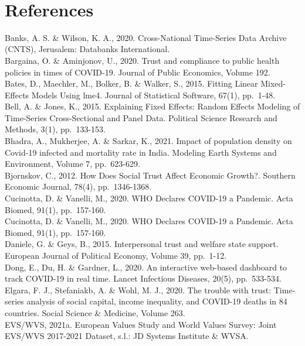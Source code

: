 \documentclass[
  11pt,
]{article}
\begin{document}
~\\

\newpage

\hypertarget{references}{%
\section*{References}\label{references}}

Banks, A. S. \& Wilson, K. A., 2020. Cross-National Time-Series Data Archive (CNTS), Jerusalem: Databanks International.\\
Bargaina, O. \& Aminjonov, U., 2020. Trust and compliance to public health policies in times of COVID-19. Journal of Public Economics, Volume 192.\\
Bates, D., Maechler, M., Bolker, B. \& Walker, S., 2015. Fitting Linear Mixed-Effects Models Using lme4. Journal of Statistical Software, 67(1), pp.~1-48.\\
Bell, A. \& Jones, K., 2015. Explaining Fixed Effects: Random Effects Modeling of Time-Series Cross-Sectional and Panel Data. Political Science Research and Methods, 3(1), pp.~133-153.\\
Bhadra, A., Mukherjee, A. \& Sarkar, K., 2021. Impact of population density on Covid-19 infected and mortality rate in India. Modeling Earth Systems and Environment, Volume 7, pp.~623-629.\\
Bjornskov, C., 2012. How Does Social Trust Affect Economic Growth?. Southern Economic Journal, 78(4), pp.~1346-1368.\\
Cucinotta, D. \& Vanelli, M., 2020. WHO Declares COVID-19 a Pandemic. Acta Biomed, 91(1), pp.~157-160.\\
Cucinotta, D. \& Vanelli, M., 2020. WHO Declares COVID-19 a Pandemic. Acta Biomed, 91(1), pp.~157-160.\\
Daniele, G. \& Geys, B., 2015. Interpersonal trust and welfare state support. European Journal of Political Economy, Volume 39, pp.~1-12.\\
Dong, E., Du, H. \& Gardner, L., 2020. An interactive web-based dashboard to track COVID-19 in real time. Lancet Infectious Diseases, 20(5), pp.~533-534.\\
Elgara, F. J., Stefaniakb, A. \& Wohl, M. J., 2020. The trouble with trust: Time-series analysis of social capital, income inequality, and COVID-19 deaths in 84 countries. Social Science \& Medicine, Volume 263.\\
EVS/WVS, 2021a. European Values Study and World Values Survey: Joint EVS/WVS 2017-2021 Dataset, s.l.: JD Systems Institute \& WVSA.\\
\end{document}

